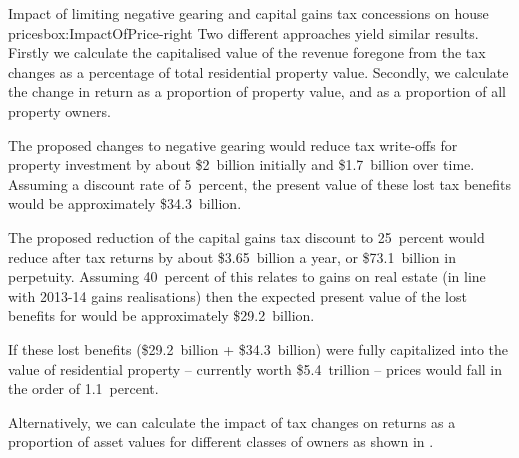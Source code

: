 {\begin{rultrabox}{Impact of limiting negative gearing and capital gains \newline tax concessions on house prices}{box:ImpactOfPrice-right}
Two different approaches yield similar results. Firstly we calculate the capitalised value of the revenue foregone from the tax changes as a percentage of total residential property value. Secondly, we calculate the change in return as a proportion of property value, and as a proportion of all property owners.



The proposed changes to negative gearing would reduce tax write-offs for property investment by about \$2~billion initially and \$1.7~billion over time. Assuming a discount rate of 
5~percent, the present value of these lost tax benefits would be approximately \$34.3~billion.

The proposed reduction of the capital gains tax discount to 25~percent would reduce after tax returns by about \$3.65~billion a year, or \$73.1~billion in perpetuity. Assuming 40~percent of this relates to gains on real estate (in line with 2013-14 gains realisations) then the expected present value of the lost benefits for would be approximately \$29.2~billion.



If these lost benefits (\$29.2~billion + \$34.3~billion) were fully capitalized into the value of residential property -- currently worth \$5.4~trillion -- prices would fall in the order of 1.1~percent.

Alternatively, we can calculate the impact of tax changes on returns as a proportion of asset values for different classes of owners as shown in
.

\begin{table}[H]
\caption{Impact of policy changes on after-tax returns}\label{tbl:Impact-house-prices}
\end{table}
\end{rultrabox}}
